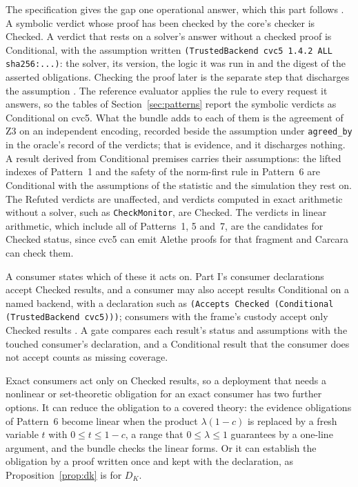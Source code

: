 \documentclass[11pt]{article}
\newcommand{\code}[1]{\texttt{#1}}
\theoremstyle{definition}
\theoremstyle{plain}
\begin{document}
The specification gives the gap one operational answer, which this part follows
\cite[Section~2.2]{spec}. A symbolic verdict whose proof has been checked by the core's checker is
Checked. A verdict that rests on a solver's answer without a checked proof is Conditional, with the
assumption written \code{(TrustedBackend cvc5 1.4.2 ALL sha256:...)}: the solver, its version, the
logic it was run in and the digest of the asserted obligations. Checking the proof later is the
separate step that discharges the assumption \cite[Section~2.7]{spec}. The reference evaluator
applies the rule to every request it answers, so the tables of Section~\ref{sec:patterns} report the
symbolic verdicts as Conditional on cvc5. What the bundle adds to each of them is the agreement of
Z3 on an independent encoding, recorded beside the assumption under \code{agreed\_by} in the
oracle's record of the verdicts; that is evidence, and it discharges nothing. A result derived from Conditional premises carries their assumptions: the lifted indexes of
Pattern~1 and the safety of the norm-first rule in Pattern~6 are Conditional with the assumptions of
the statistic and the simulation they rest on. The Refuted verdicts are unaffected, and verdicts
computed in exact arithmetic without a solver, such as \code{CheckMonitor}, are Checked. The
verdicts in linear arithmetic, which include all of Patterns~1, 5 and~7, are the candidates for
Checked status, since cvc5 can emit Alethe proofs for that fragment and Carcara can check them.

A consumer states which of these it acts on. Part I's consumer declarations accept Checked results,
and a consumer may also accept results Conditional on a named backend, with a declaration such as
\code{(Accepts Checked (Conditional (TrustedBackend cvc5)))}; consumers with the frame's custody accept
only Checked results \cite[Section~3.5]{part1}. A gate compares each result's status and assumptions
with the touched consumer's declaration, and a Conditional result that the consumer does not accept
counts as missing coverage.

Exact consumers act only on Checked results, so a deployment that needs a nonlinear or
set-theoretic obligation for an exact consumer has two further options. It can reduce the
obligation to a covered theory: the evidence obligations of Pattern~6 become linear when the
product $\lambda(1-c)$ is replaced by a fresh variable $t$ with $0\le t\le 1-c$, a range that
$0\le\lambda\le 1$ guarantees by a one-line argument, and the bundle checks the linear forms. Or it
can establish the obligation by a proof written once and kept with the declaration, as
Proposition~\ref{prop:dk} is for $D_K$.
\end{document}

